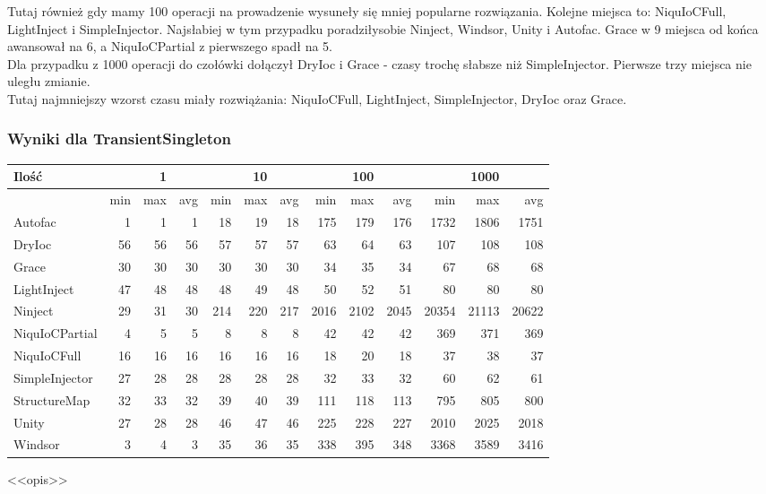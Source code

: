 \documentclass[12pt]{article}
\begin{document}
Tutaj również gdy mamy 100 operacji na prowadzenie wysuneły się mniej popularne rozwiązania. Kolejne miejsca to: NiquIoCFull, LightInject i SimpleInjector. Najsłabiej w tym przypadku poradziłysobie Ninject, Windsor, Unity i Autofac. Grace w 9 miejsca od końca awansował na 6, a NiquIoCPartial z pierwszego spadł na 5.\\
Dla przypadku z 1000 operacji do czołówki dołączył DryIoc i Grace - czasy trochę słabsze niż SimpleInjector. Pierwsze trzy miejsca nie uległu zmianie.\\
Tutaj najmniejszy wzorst czasu miały rozwiążania: NiquIoCFull, LightInject, SimpleInjector, DryIoc oraz Grace.

\subsubsection{Wyniki dla TransientSingleton}
\begin{center}
\begin{small}
	\begin{tabular}{ | l | r r r | r r r | r r r | r r r | }
    		\hline
     		Ilość & & 1 & & & 10 & & & 100 & & & 1000 & \\ \hline
     		 & min & max & avg & min & max & avg & min & max & avg & min & max & avg \\ \hline
    		Autofac & 1 & 1 & 1 & 18 & 19 & 18 & 175 & 179 & 176 & 1732 & 1806 & 1751 \\ \hline
		DryIoc & 56 & 56 & 56 & 57 & 57 & 57 & 63 & 64 & 63 & 107 & 108 & 108 \\ \hline
		Grace & 30 & 30 & 30 & 30 & 30 & 30 & 34 & 35 & 34 & 67 & 68 & 68 \\ \hline
		LightInject & 47 & 48 & 48 & 48 & 49 & 48 & 50 & 52 & 51 & 80 & 80 & 80 \\ \hline
		Ninject & 29 & 31 & 30 & 214 & 220 & 217 & 2016 & 2102 & 2045 & 20354 & 21113 & 20622 \\ \hline
		NiquIoCPartial & 4 & 5 & 5 & 8 & 8 & 8 & 42 & 42 & 42 & 369 & 371 & 369 \\ \hline
		NiquIoCFull & 16 & 16 & 16 & 16 & 16 & 16 & 18 & 20 & 18 & 37 & 38 & 37 \\ \hline
		SimpleInjector & 27 & 28 & 28 & 28 & 28 & 28 & 32 & 33 & 32 & 60 & 62 & 61 \\ \hline
		StructureMap & 32 & 33 & 32 & 39 & 40 & 39 & 111 & 118 & 113 & 795 & 805 & 800 \\ \hline
		Unity & 27 & 28 & 28 & 46 & 47 & 46 & 225 & 228 & 227 & 2010 & 2025 & 2018 \\ \hline
		Windsor & 3 & 4 & 3 & 35 & 36 & 35 & 338 & 395 & 348 & 3368 & 3589 & 3416 \\
    		\hline
  	\end{tabular}
\end{small}
\end{center}
<<opis>>
\end{document}
